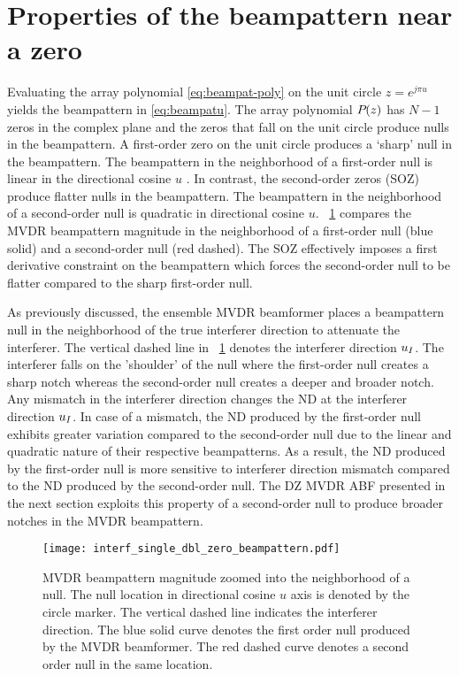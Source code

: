 \section{Properties of the beampattern near a  zero}
\label{sec:second-order-zeros}
Evaluating the array polynomial \eqref{eq:beampat-poly} on the unit
circle $z = e^{j\pi u}$ yields the beampattern in
\eqref{eq:beampatu}. The array polynomial ${P}_{}(z)$ has $N - 1$
zeros in the complex plane and the zeros that fall on the unit circle
produce nulls in the beampattern. A first-order zero on the unit
circle produces a `sharp' null in the beampattern. The beampattern in
the neighborhood of a first-order null is linear in the directional
cosine $u$ \cite[Sec.~3.2.3]{vtree2002oap}\cite{Steinberg1976}. In contrast, the
second-order zeros (SOZ) produce flatter nulls in the beampattern. The
beampattern in the neighborhood of a second-order null is quadratic in
directional cosine $u$. \figurename{}~\ref{fig:mvdr-null-zero}
compares the MVDR beampattern magnitude in the neighborhood of a first-order
null (blue solid) and a second-order null (red dashed). The SOZ effectively
imposes a first derivative constraint on the beampattern which forces
the second-order null to be flatter compared to the sharp first-order
null.

As previously discussed, the ensemble MVDR beamformer places a
beampattern null in the neighborhood of the true interferer direction
to attenuate the interferer. The vertical dashed line in
\figurename{}~\ref{fig:mvdr-null-zero} denotes the interferer
direction $u_I$. The interferer falls on the 'shoulder' of the
null where the first-order null creates a sharp notch whereas the
second-order null creates a deeper and broader notch. Any mismatch in
the interferer direction changes the ND at the interferer direction
$u_I$. In case of a mismatch, the ND produced by the first-order
null exhibits greater variation compared to the second-order null due
to the linear and quadratic nature of their respective
beampatterns. As a result, the ND produced by the first-order null is
more sensitive to interferer direction mismatch compared to the ND
produced by the second-order null. The DZ MVDR ABF presented in the
next section exploits this property of a second-order null to produce
broader notches in the MVDR beampattern.

\begin{figure}[!hp]
  \centering
  \texttt{[image: interf\_single\_dbl\_zero\_beampattern.pdf]}
  \caption[MVDR beampattern magnitude zoomed into the neighborhood of
    a null]{MVDR beampattern magnitude zoomed into the neighborhood of
    a null. The null location in directional cosine $u$ axis is
    denoted by the circle marker.  The vertical dashed line indicates
    the interferer direction. The blue solid curve denotes the first
    order null produced by the MVDR beamformer. The red dashed curve
    denotes a second order null in the same location.}
  \label{fig:mvdr-null-zero}
\end{figure}

